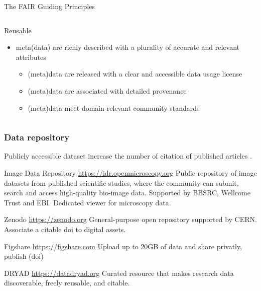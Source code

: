 \documentclass[ignorenonframetext,aspectratio=169,10pt,xcolor=table]{beamer}
\begin{document}
\begin{frame}{The FAIR Guiding Principles}
\begin{columns}
\begin{column}{0.5\textwidth}
    \begin{block}{Reusable}
      \begin{itemize}
      \item meta(data) are richly described with a plurality of accurate and relevant attributes
        \begin{itemize}
        \item (meta)data are released with a clear and accessible data usage license
        \item (meta)data are associated with detailed provenance
        \item (meta)data meet domain-relevant community standards
        \end{itemize}
      \end{itemize}
    \end{block}
  \end{column}
  \end{columns}

  \end{frame}


\begin{frame} \frametitle{Data repository}

  Publicly accessible dataset increase the number of citation of published
  articles .

  \begin{block}{Image Data Repository \url{https://idr.openmicroscopy.org}}
    Public repository of image datasets from published scientific studies, where
    the community can submit, search and access high-quality bio-image data.
    Supported by BBSRC, Wellcome Trust and EBI. Dedicated viewer for microscopy data.
  \end{block}

  \begin{block}{Zenodo \url{https://zenodo.org}}
    General-purpose open repository supported by CERN. Associate a citable doi
    to digital assets.
  \end{block}

  \begin{block}{Figshare \url{https://figshare.com}}
    Upload up to 20GB of data and share privatly, publish (doi)
  \end{block}

  \begin{block}{DRYAD \url{https://datadryad.org}}
    Curated resource that makes research data discoverable, freely reusable, and citable.
  \end{block}


\end{frame}
\end{document}

